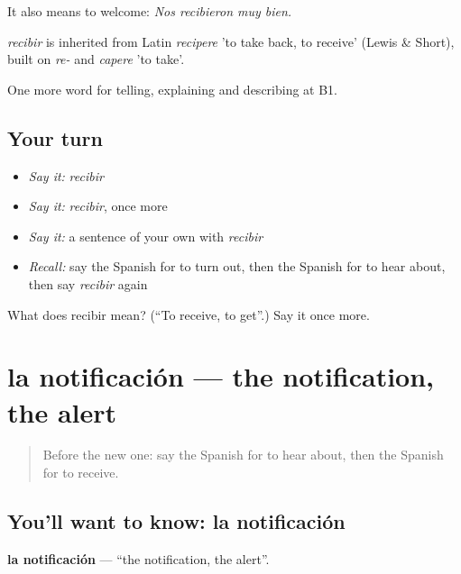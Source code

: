 It also means to welcome: \emph{Nos recibieron muy bien.}

\begin{cousinweb}
\emph{recibir} is inherited from Latin \emph{recipere} 'to take back, to receive' (Lewis \& Short), built on \emph{re-} and \emph{capere} 'to take'.
\end{cousinweb}

\begin{grammarlens}[title={What you've built}]
One more word for telling, explaining and describing at B1.
\end{grammarlens}

\subsection*{Your turn}
\begin{itemize}
\raggedright
  \item \emph{Say it:} \emph{recibir}
  \item \emph{Say it:} \emph{recibir}, once more
  \item \emph{Say it:} a sentence of your own with \emph{recibir}
  \item \emph{Recall:} say the Spanish for to turn out, then the Spanish for to hear about, then say \emph{recibir} again
\end{itemize}

\begin{tcolorbox}[breakable,colback=teal!4,colframe=teal!35!black,title={Before you move on}]
What does recibir mean? (\textquotedblleft{}To receive, to get\textquotedblright{}.) Say it once more.
\end{tcolorbox}
\section[la notificación]{la notificación — the notification, the alert}

\label{lesson:ES-C574-notificacion}



\begin{quote}
Before the new one: say the Spanish for to hear about, then the Spanish for to receive.
\end{quote}

\subsection*{You'll want to know: la notificación}
\textbf{la notificación} — \textquotedblleft{}the notification, the alert\textquotedblright{}.

